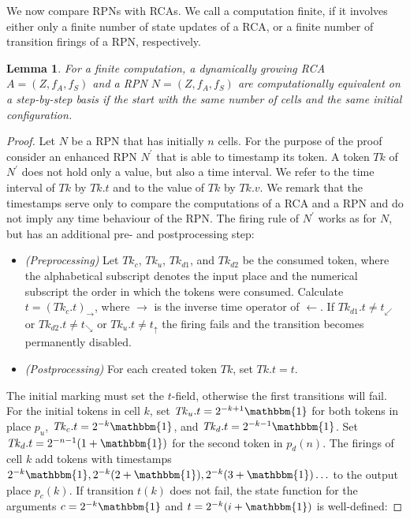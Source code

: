 \documentclass[pre,amssymb,showpacs,showkeys,preprint]{revtex4}
\newtheorem{lemma}{Lemma}
\begin{document}
We now compare RPNs with RCAs.
We call a computation finite, if it involves either only a finite number of state updates of a RCA, or
a finite number of transition firings of a RPN, respectively.
\begin{lemma}
\label{lemma:comp-equivalence}
For a finite computation, a dynamically growing RCA $A = (Z, f_A, f_S)$ and a RPN $N = (Z, f_A, f_S)$ are computationally
equivalent on a step-by-step basis if the start with the same number of cells and the same initial configuration.
\end{lemma}
\begin{proof}
Let $N$ be a RPN that has initially $n$ cells.
For the purpose of the proof consider an enhanced RPN $N^\prime$ that is able to timestamp its token.
A token $\mathit{Tk}$ of $N^\prime$ does not hold only a value, but also a time interval.
We refer to the time interval of $\mathit{Tk}$ by $\mathit{Tk}.t$ and to the value of $\mathit{Tk}$ by $\mathit{Tk}.v$.
We remark that the timestamps serve only to compare the computations of a RCA and a RPN and do not imply any time behaviour of the RPN.
The firing rule of $N^\prime$ works as for $N$, but has an additional pre- and postprocessing step:
\begin{itemize}
\item \emph{(Preprocessing)}
Let $\mathit{Tk}_c$, $\mathit{Tk}_u$, $\mathit{Tk}_{d1}$, and $\mathit{Tk}_{d2}$ be the consumed token, where the alphabetical subscript denotes
the input place and the numerical subscript the order in which the tokens were consumed.
Calculate $t = (\mathit{Tk}_c.t)_\rightarrow$, where $\rightarrow$ is the inverse time operator of $\leftarrow$.
If $\mathit{Tk}_{d1}.t \neq t_\swarrow$ or $\mathit{Tk}_{d2}.t \neq t_\searrow$ or $\mathit{Tk}_{u}.t \neq t_\uparrow$ the firing fails
and the transition becomes permanently disabled.
\item \emph{(Postprocessing)}
For each created token $\mathit{Tk}$, set $\mathit{Tk}.t = t$.
\end{itemize}
The initial marking must set the $t$-field, otherwise the first transitions will fail.
For the initial tokens in cell $k$,
set $\mathit{Tk}_u.t = 2^{-k+1} \mathbbm{1}$ for both tokens in place $p_u$, $\mathit{Tk}_c.t = 2^{-k} \mathbbm{1}$,
and $\mathit{Tk}_d.t = 2^{-k-1} \mathbbm{1}$.
Set $\mathit{Tk}_d.t = 2^{-n-1} (1 + \mathbbm{1})$ for the second token in $p_d(n)$.
The firings of cell $k$ add tokens with timestamps $2^{-k} \mathbbm{1}, 2^{-k} (2 + \mathbbm{1}), 2^{-k} (3 + \mathbbm{1}) \ldots$
to the output place $p_c(k)$.
If transition $t(k)$ does not fail, the state function for the arguments $c=2^{-k} \mathbbm{1}$ and $t=2^{-k} (i + \mathbbm{1})$ is well-defined:

\end{proof}
\end{document}
